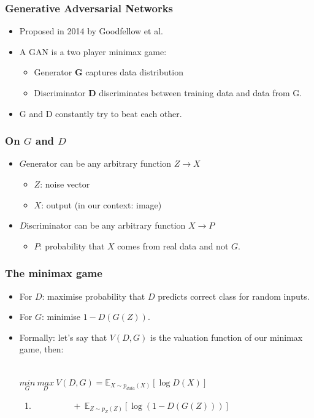 \documentclass[xcolor=dvipsnames]{beamer}
\begin{document}
\begin{frame}
\frametitle{Generative Adversarial Networks}
\begin{itemize}
	\item Proposed in 2014 by Goodfellow et al.\cite{goodfellow2014generative}
	\item A GAN is a two player minimax game:
		\begin{itemize}
			\item Generator \textbf{G} captures data distribution
			\item Discriminator \textbf{D} discriminates between training data and data from G.
		\end{itemize}
	\item G and D constantly try to beat each other.
\end{itemize}
\end{frame}



\begin{frame}
\frametitle{On $G$ and $D$}
\begin{itemize}
	\item \textbf{$G$}enerator can be any arbitrary function $Z \rightarrow X$
		\begin{itemize}
			\item $Z$: noise vector
			\item $X$: output (in our context: image)
		\end{itemize}
	\item \textbf{$D$}iscriminator can be any arbitrary function $X \rightarrow P$
		\begin{itemize}
			\item $P$: probability that $X$ comes from real data and not $G$.
		\end{itemize}
\end{itemize}
\end{frame}



\begin{frame}
\frametitle{The minimax game}
\begin{itemize}
	\item For $D$: maximise probability that $D$ predicts correct class for random inputs.
	\item For $G$: minimise $1 - D(G(Z))$.
	\item Formally: let's say that $V(D,G)$ is the valuation function of our minimax game, then:\\\

$\underset{G}{min}\ \underset{D}{max}\ V(D, G) = \mathbb{E}_{X \sim p_{data}(X)}[\log D(X)]$
	
	\begin{enumerate}[]
		\item $\ \ \ \ \ \ \ \ \ \ \ \ \ \ \ \ \ \ \ \ +\ \mathbb{E}_{Z \sim p_Z(Z)}[\log(1 - D(G(Z)))]$
	\end{enumerate}
\end{itemize}
\end{frame}
\end{document}
